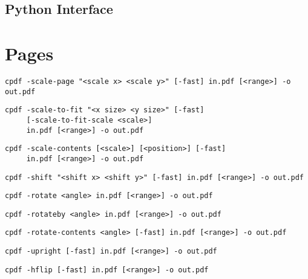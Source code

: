 \documentclass{book}
\begin{document}
\begin{pycpdflib}
\clearpage
\section*{Python Interface}
\begin{small}\tt

\end{small}
\end{pycpdflib}

\chapter{Pages}\label{chap:3}
\pagestyle{fancy}
  \label{pages}
  \begin{framed}
  \small\noindent\verb!cpdf -scale-page "<scale x> <scale y>" [-fast] in.pdf [<range>] -o out.pdf!
   
  \vspace{1.5mm}
  \small\noindent\verb!cpdf -scale-to-fit "<x size> <y size>" [-fast]!\\
        \noindent\verb!     [-scale-to-fit-scale <scale>]!\\    
        \noindent\verb!     in.pdf [<range>] -o out.pdf!

  \vspace{1.5mm}
  \small\noindent\verb!cpdf -scale-contents [<scale>] [<position>] [-fast]!\\
        \noindent\verb!     in.pdf [<range>] -o out.pdf!
  
  \vspace{1.5mm}
  \small\noindent\verb!cpdf -shift "<shift x> <shift y>" [-fast] in.pdf [<range>] -o out.pdf!

  \vspace{1.5mm}
  \small\noindent\verb!cpdf -rotate <angle> in.pdf [<range>] -o out.pdf!

  \vspace{1.5mm}
  \small\noindent\verb!cpdf -rotateby <angle> in.pdf [<range>] -o out.pdf!

  \vspace{1.5mm}
  \small\noindent\verb!cpdf -rotate-contents <angle> [-fast] in.pdf [<range>] -o out.pdf!

  \vspace{1.5mm}
  \small\noindent\verb!cpdf -upright [-fast] in.pdf [<range>] -o out.pdf!

  \vspace{1.5mm}
  \small\noindent\verb!cpdf -hflip [-fast] in.pdf [<range>] -o out.pdf!


\end{framed}
\end{document}
